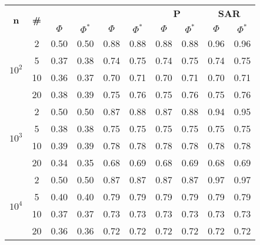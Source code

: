 \begin{table}[h]
\begin{small}
		\bigskip
		\begin{tabular}{|c|c|cc|cc|cc|cc|}
			\hline
			\multirow{2}{*}{\textbf{n}} &
			\multirow{2}{*}{\textbf{\#}} &
			\multicolumn{2}{c|}{\textbf{\astar}} &
			\multicolumn{2}{c|}{\textbf{\ambush}} &
			\multicolumn{2}{c|}{\textbf{P}} &
			\multicolumn{2}{c|}{\textbf{SAR}}\\
			& & $\Phi$ & $\Phi^*$ & $\Phi$ & $\Phi^*$&
			$\Phi$ & $\Phi^*$& $\Phi$ & $\Phi^*$\\
			\hline
			\multirow{4}{*}{$10^2$}
			& 2 & 0.50 & 0.50 & 0.88 & 0.88 & 0.88 & 0.88 & 0.96 & 0.96\\
			& 5 & 0.37 & 0.38 & 0.74 & 0.75 & 0.74 & 0.75 & 0.74 & 0.75\\
			& 10 & 0.36 & 0.37 & 0.70 & 0.71 & 0.70 & 0.71 & 0.70 & 0.71\\
			& 20 & 0.38 & 0.39 & 0.75 & 0.76 & 0.75 & 0.76 & 0.75 & 0.76\\
			\hline
			\multirow{4}{*}{$10^3$}
			& 2 & 0.50 & 0.50 & 0.87 & 0.88 & 0.87 & 0.88 & 0.94 & 0.95\\
			& 5 & 0.38 & 0.38 & 0.75 & 0.75 & 0.75 & 0.75 & 0.75 & 0.75\\
			& 10 & 0.39 & 0.39 & 0.78 & 0.78 & 0.78 & 0.78 & 0.78 & 0.78\\
			& 20 & 0.34 & 0.35 & 0.68 & 0.69 & 0.68 & 0.69 & 0.68 & 0.69\\
			\hline
			\multirow{4}{*}{$10^4$}
			& 2 & 0.50 & 0.50 & 0.87 & 0.87 & 0.87 & 0.87 & 0.97 & 0.97\\
			& 5 & 0.40 & 0.40 & 0.79 & 0.79 & 0.79 & 0.79 & 0.79 & 0.79\\
			& 10 & 0.37 & 0.37 & 0.73 & 0.73 & 0.73 & 0.73 & 0.73 & 0.73\\
			& 20 & 0.36 & 0.36 & 0.72 & 0.72 & 0.72 & 0.72 & 0.72 & 0.72\\
			\hline
		\end{tabular}
	\end{small}
\end{table}
